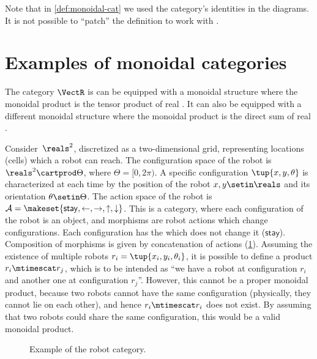 \begin{remark}
    Note that in \cref{def:monoidal-cat} we used the category's identities in the diagrams.
    It is not possible to ``patch'' the definition to work with .
\end{remark}

\section{Examples of monoidal categories}



\begin{example}
    \label{ex:Vect-symmetric-monoidal}
    The category $\VectR$ is can be equipped with a monoidal structure where the monoidal product is the tensor product of real .
    It can also be equipped with a different monoidal structure where the monoidal product is the direct sum of real .
\end{example}

\begin{example}
    \label{ex:robot}
    Consider~$\reals^2$, discretized as a two-dim\-ensional grid, representing locations (cells) which a robot can reach.
    The configuration space of the robot is $\reals^2\cartprod \Theta$, where $\Theta=[0,2\pi)$.
    A specific configuration $\tup{x,y,\theta}$ is characterized at each time by the position of the robot $x,y\setin \reals$ and its orientation $\theta \setin \Theta$.
    The action space of the robot is $\mathcal{A}=\makeset{\mathsf{stay},\leftarrow, \rightarrow, \uparrow, \downarrow}$.
    This is a category, where each configuration of the robot is an object, and morphisms are robot actions which change configurations.
    Each configuration has the  which does not change it ($\mathsf{stay}$).
    Composition of morphisms is given by concatenation of actions (\cref{fig:robotcategory}).
    Assuming the existence of multiple robots $r_i=\tup{x_i,y_i,\theta_i}$, it is possible to define a product $r_i\mtimescat r_j$, which is to be intended as ``we have a robot at configuration $r_i$ and another one at configuration $r_j$''.
    However, this cannot be a proper monoidal product, because two robots cannot have the same configuration (physically, they cannot lie on each other), and hence $r_i\mtimescat r_i$ does not exist.
    By assuming that two robots could share the same configuration, this would be a valid monoidal product.
    \begin{figure}[tbh]
        \centering
        \caption{Example of the robot category. }
        \label{fig:robotcategory}
    \end{figure}
\end{example}

